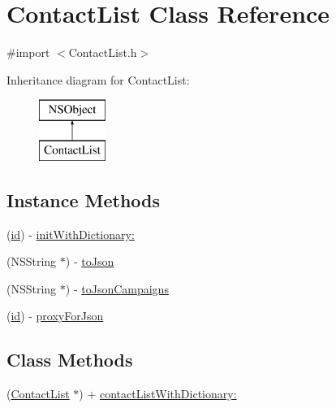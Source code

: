 \hypertarget{interface_contact_list}{\section{Contact\-List Class Reference}
\label{interface_contact_list}
}


{\ttfamily \#import $<$Contact\-List.\-h$>$}

Inheritance diagram for Contact\-List\-:\begin{figure}[H]
\begin{center}
\leavevmode
\includegraphics[height=2.000000cm]{interface_contact_list}
\end{center}
\end{figure}
\subsection*{Instance Methods}
\begin{DoxyCompactItemize}
\item 
(\hyperlink{interface_contact_list_a49c285eb7e79510df7174dc7dc98cfb3}{id}) -\/ \hyperlink{interface_contact_list_a2d39e69823679158bf8ea9d360d0ced0}{init\-With\-Dictionary\-:}
\item 
(N\-S\-String $\ast$) -\/ \hyperlink{interface_contact_list_af70b04480731d9a36c88af1455aabfba}{to\-Json}
\item 
(N\-S\-String $\ast$) -\/ \hyperlink{interface_contact_list_ae53a1e421705939a439d719c6534a31b}{to\-Json\-Campaigns}
\item 
(\hyperlink{interface_contact_list_a49c285eb7e79510df7174dc7dc98cfb3}{id}) -\/ \hyperlink{interface_contact_list_a21d8e2af5f9529c26c1a691a8ef67ab5}{proxy\-For\-Json}
\end{DoxyCompactItemize}
\subsection*{Class Methods}
\begin{DoxyCompactItemize}
\item 
(\hyperlink{interface_contact_list}{Contact\-List} $\ast$) + \hyperlink{interface_contact_list_a66324c7c96144612c4993d059a79f48e}{contact\-List\-With\-Dictionary\-:}
\end{DoxyCompactItemize}
